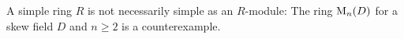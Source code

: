 \begin{warning}
  A simple ring $R$ is not necessarily simple as an $R$-module:
  The ring $\operatorname{M}_n(D)$ for a skew field $D$ and $n \geq 2$ is a counterexample.
\end{warning}


% 
% 
%   
% 
% 
